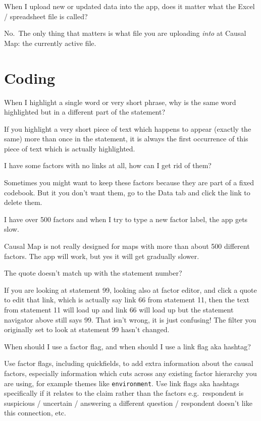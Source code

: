 \documentclass[
]{book}
\begin{document}
When I upload new or updated data into the app, does it matter what the Excel / spreadsheet file is called?

No.~The only thing that matters is what file you are uploading \emph{into} at Causal Map: the currently active file.

\hypertarget{coding}{%
\section{Coding}\label{coding}}

When I highlight a single word or very short phrase, why is the same word highlighted but in a different part of the statement?

If you highlight a very short piece of text which happens to appear (exactly the same) more than once in the statement, it is always the first occurrence of this piece of text which is actually highlighted.

I have some factors with no links at all, how can I get rid of them?

Sometimes you might want to keep these factors because they are part of a fixed codebook. But it you don't want them, go to the Data tab and click the link to delete them.

I have over 500 factors and when I try to type a new factor label, the app gets slow.

Causal Map is not really designed for maps with more than about 500 different factors. The app will work, but yes it will get gradually slower.

The quote doesn't match up with the statement number?

If you are looking at statement 99, looking also at factor editor, and click a quote to edit that link, which is actually say link 66 from statement 11, then the text from statement 11 will load up and link 66 will load up but the statement navigator above still says 99. That isn't wrong, it is just confusing! The filter you originally set to look at statement 99 hasn't changed.

When should I use a factor flag, and when should I use a link flag aka hashtag?

Use factor flags, including quickfields, to add extra information about the causal factors, especially information which cuts across any existing factor hierarchy you are using, for example themes like \texttt{environment}. Use link flags aka hashtags specifically if it relates to the claim rather than the factors e.g.~respondent is suspicious / uncertain / answering a different question / respondent doesn't like this connection, etc.
\end{document}

